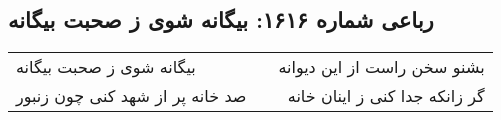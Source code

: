 \begin{center}
\section*{رباعی شماره ۱۶۱۶: بیگانه شوی ز صحبت بیگانه}
\label{sec:1616}
\begin{longtable}{l p{0.5cm} r}
بیگانه شوی ز صحبت بیگانه
&&
بشنو سخن راست از این دیوانه
\\
صد خانه پر از شهد کنی چون زنبور
&&
گر زانکه جدا کنی ز اینان خانه
\\
\end{longtable}
\end{center}
